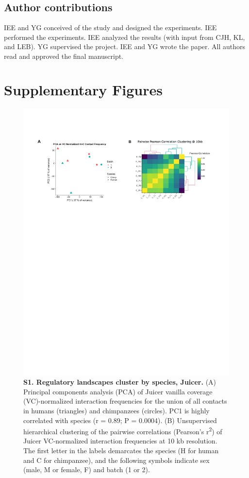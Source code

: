 \subsection{Author contributions}

IEE and YG conceived of the study and designed the experiments. IEE performed the experiments. IEE analyzed the results (with input from CJH, KL, and LEB). YG supervised the project. IEE and YG wrote the paper. All authors read and approved the final manuscript.

\pagebreak
\clearpage

\section{Supplementary Figures}\label{ch02-supplementary-figures}

\begin{figure}[!htb]
\centering
\includegraphics[width=6in]{img/figS1.pdf}
\caption[Regulatory landscapes cluster by species, Juicer.]{\textbf{S1. Regulatory landscapes cluster by species, Juicer.} (A) Principal components analysis (PCA) of Juicer vanilla coverage (VC)-normalized interaction frequencies for the union of all contacts in humans (triangles) and chimpanzees (circles). PC1 is highly correlated with species (r = 0.89; P = 0.0004). (B) Unsupervised hierarchical clustering of the pairwise correlations (Pearson's r\textsuperscript{2}) of Juicer VC-normalized interaction frequencies at 10 kb resolution. The first letter in the labels demarcates the species (H for human and C for chimpanzee), and the following symbols indicate sex (male, M or female, F) and batch (1 or 2).}
\label{fig:figS1}
\end{figure}

